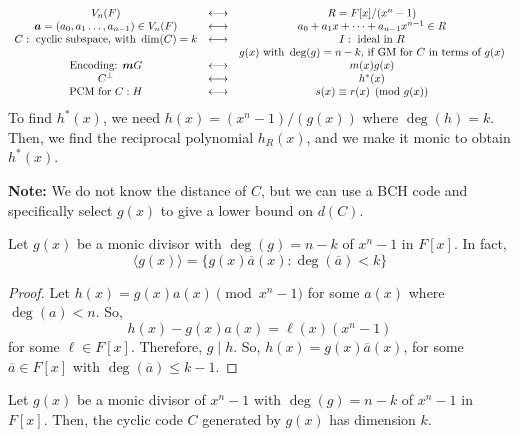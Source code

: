 
\[
    \begin{array}{ccc}
        V_n(F)                                      & \longleftrightarrow & R=F[x]/(x^n-1)                      \\
        \bm{a}=(a_0,a_1\ldots ,a_{n-1})\in V_n(F)   & \longleftrightarrow & a_0+a_1x+\cdots+a_{n-1}x^{n-1}\in R \\
        C: \text{ cyclic subspace, with } \dim(C)=k & \longleftrightarrow & I:\text{ ideal in } R               \\
                                                    &                     & g(x) \text{ with } \deg(g)=n-k
        \text{, if GM for $ C $ in terms of $ g(x)$}                                                            \\
        \text{Encoding: $ \bm{m}G $}                & \longleftrightarrow & m(x)g(x)                            \\
        C^{\perp}                                   & \longleftrightarrow & h^*(x)                              \\
        \text{PCM for } C: H                        & \longleftrightarrow & s(x)\equiv r(x)\pmod{g(x)}
    \end{array}
\]
To find $ h^*(x) $, we need $ h(x)=(x^n-1)/(g(x)) $ where $ \deg(h)=k $. Then,
we find the reciprocal polynomial $ h_R(x) $, and we make it monic to obtain
$ h^*(x) $.

\textbf{Note:} We do not know the distance of $ C $, but we can use a BCH
code and specifically select $ g(x) $ to give a lower bound on
$ d(C) $.

\begin{Lemma}{}{}
    Let $ g(x) $ be a monic divisor with $ \deg(g)=n-k $ of
    $ x^n-1 $ in $ F[x] $. In fact,
    \[ \langle g(x) \rangle = \{g(x)\overline{a}(x):\deg(\overline{a})<k\} \]
\end{Lemma}

\begin{proof}
    Let $ h(x)=g(x)a(x)\pmod{x^n-1} $ for some $ a(x) $ where $ \deg(a)<n $. So,
    \[ h(x)-g(x)a(x)=\ell(x)(x^n-1) \]
    for some $ \ell \in F[x] $. Therefore, $ g\mid h $.
    So, $ h(x)=g(x)\overline{a}(x) $, for some $ \overline{a}\in F[x] $
    with $ \deg(\overline{a})\leqslant k-1 $.
\end{proof}

\begin{Theorem}{}{}
    Let $ g(x) $ be a monic divisor of $ x^n-1 $ with $ \deg(g)=n-k $ of
    $ x^n-1 $ in $ F[x] $. Then, the cyclic code $ C $ generated
    by $ g(x) $ has dimension $ k $.
\end{Theorem}

